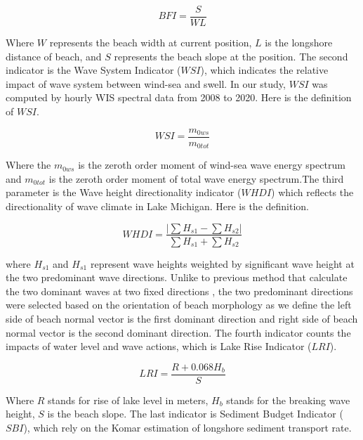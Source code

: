\begin{equation}
    BFI = \frac{S}{WL}
\label{eq:eq5.1}
\end{equation}

Where $W$ represents the beach width at current position, $L$ is the longshore
distance of beach, and $S$ represents the beach slope at the position. The
second indicator is the Wave System Indicator ($WSI$), which indicates the
relative impact of wave system between wind-sea and swell. In our study, $WSI$
was computed by hourly WIS spectral data from 2008 to 2020. Here is the
definition of $WSI$.

\begin{equation}
    WSI = \frac{m_{0ws}}{m_{0tot}}
\label{eq:eq5.2}
\end{equation}

Where the $m_{0ws}$ is the zeroth order moment of wind-sea wave energy spectrum
and $m_{0tot}$ is the zeroth order moment of total wave energy spectrum.The
third parameter is the Wave height directionality indicator ($WHDI$) which
reflects the directionality of wave climate in Lake Michigan.  Here is the
definition.

\begin{equation}
    WHDI = \frac{|\sum H_{s1}-\sum H_{s2}|}{\sum H_{s1}+\sum H_{s2}}
\label{eq:eq5.3}
\end{equation}

where $H_{s1}$ and $H_{s1}$ represent wave heights weighted by significant wave
height at the two predominant wave directions. Unlike to previous method that
calculate the two dominant waves at two fixed directions
\citep{wiggins_coastal_2019,wiggins_regionally-coherent_2019}, the two
predominant directions were selected based on the orientation of beach
morphology as we define the left side of beach normal vector is the first
dominant direction and right side of beach normal vector is the second dominant
direction. The fourth indicator counts the impacts of water level and wave
actions, which is Lake Rise Indicator ($LRI$). 

\begin{equation}
    LRI = \frac{R + 0.068 H_b}{S}
\label{eq:eq5.4}
\end{equation}

Where $R$ stands for rise of lake level in meters, $H_b$ stands for the breaking
wave height, $S$ is the beach slope. The last indicator is Sediment Budget
Indicator ($SBI$), which rely on the Komar estimation of longshore sediment
transport rate.

